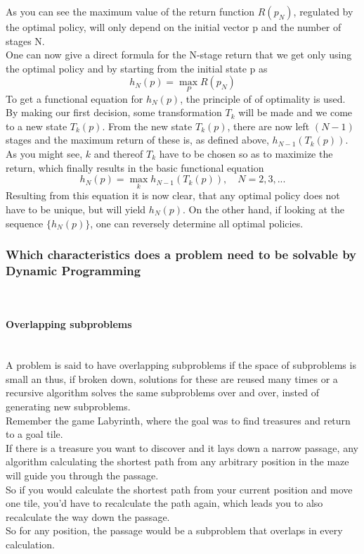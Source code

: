 \documentclass[conference]{IEEEtran}
\begin{document}
As you can see the maximum value of the return function $R(p_N)$, regulated by the optimal policy, will only depend on the initial vector p and the number of stages N.
\\
One can now give a direct formula for the N-stage return that we get only using the optimal policy and by starting from the initial state p as
\begin{equation}
h_N(p) = \max_P R(p_N)
\end{equation}
To get a functional equation for $h_N(p)$, the principle of of optimality is used. By making our first decision, some transformation $T_k$ will be made and we come to a new state $T_k(p)$.
From the new state $T_k(p)$, there are now left $(N-1)$ stages and the maximum return of these is, as defined above, $h_{N-1}(T_k(p))$. 
\\
As you might see, $k$ and thereof $T_k$ have to be chosen so as to maximize the return, which finally results in the basic functional equation
\begin{equation}
h_N(p) = \max_k h_{N-1}(T_k(p)), \quad N = 2, 3, ...
\end{equation}
Resulting from this equation it is now clear, that any optimal policy does not have to be unique, but will yield $h_N(p)$. On the other hand, if looking at the sequence $\{h_N(p)\}$, one can reversely determine all optimal policies.
\cite{Bellman.30.07.1954}\\
\subsubsection{Which characteristics does a problem need to be solvable by Dynamic Programming}
\quad \\
\paragraph{Overlapping subproblems}
\quad \\
A problem is said to have overlapping subproblems if the space of subproblems is small an thus, if broken down, solutions for these are reused many times or a recursive algorithm solves the same subproblems over and over, insted of generating new subproblems. \cite{Cormen.2007}
\\
Remember the game Labyrinth, where the goal was to find treasures and return to a goal tile.\\
If there is a treasure you want to discover and it lays down a narrow passage, any algorithm calculating the shortest path from any arbitrary position in the maze will guide you through the passage.\\
So if you would calculate the shortest path from your current position and move one tile, you'd have to recalculate the path again, which leads you to also recalculate the way down the passage.\\
So for any position, the passage would be a subproblem that overlaps in every calculation. 
\end{document}
